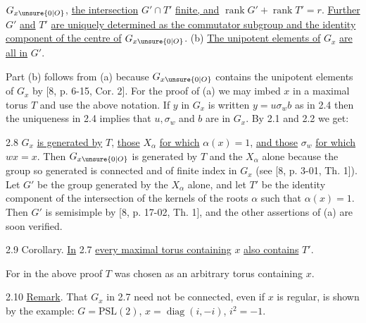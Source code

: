 

$G_{x\unsure{0|O}}$, \uline{the intersection} $G'\cap T'$ \uline{finite, and} $\operatorname{rank}G'+\operatorname{rank}T'=r$. \uline{Further} $G'$ \uline{and} $T'$ \uline{are uniquely determined as the commutator subgroup and the identity component of the centre of} $G_{x\unsure{0|O}}$. (b) \uline{The unipotent elements of} $G_x$ \uline{are all in} $G'$.

Part (b) follows from (a) because $G_{x\unsure{0|O}}$ contains the unipotent elements of $G_x$ by [8, p. 6-15, Cor. 2]. For the proof of (a) we may imbed $x$ in a maximal torus $T$ and use the above notation. If $y$ in $G_x$ is written $y=u\sigma_wb$ as in 2.4 then the uniqueness in 2.4 implies that $u,\sigma_w$ and $b$ are in $G_x$. By 2.1 and 2.2 we get:

2.8 $G_x$ \uline{is generated by} $T$, \uline{those} $X_\alpha$ \uline{for which} $\alpha(x)=1$, \uline{and those} $\sigma_w$ \uline{for which} $wx=x$. Then $G_{x\unsure{0|O}}$ is generated by $T$ and the $X_\alpha$ alone because the group so generated is connected and of finite index in $G_x$ (see [8, p. 3-01, Th. 1]). Let $G'$ be the group generated by the $X_\alpha$ alone, and let $T'$ be the identity component of the intersection of the kernels of the roots $\alpha$ such that $\alpha(x)=1$. Then $G'$ is semisimple by [8, p. 17-02, Th. 1], and the other assertions of (a) are soon verified.

2.9 Corollary. \uline{In} 2.7 \uline{every maximal torus containing} $x$ \uline{also contains} $T'$.

For in the above proof $T$ was chosen as an arbitrary torus containing $x$.

2.10 \uline{Remark}. That $G_x$ in 2.7 need not be connected, even if $x$ is regular, is shown by the example: $G=\mathrm{PSL}(2)$, $x=\operatorname{diag}(i,-i)$, $i^2=-1$.



